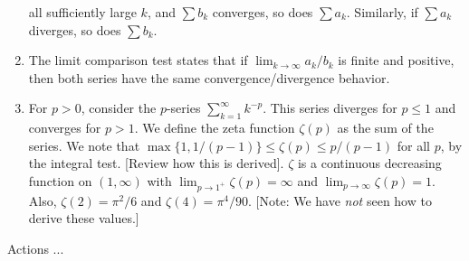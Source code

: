 \documentclass[10pt]{amsart}
\begin{document}
\begin{enumerate}
  all sufficiently large $k$, and $\sum b_k$ converges, so does $\sum
  a_k$. Similarly, if $\sum a_k$ diverges, so does $\sum b_k$.
\item The limit comparison test states that if $\lim_{k \to \infty}
  a_k/b_k$ is finite and positive, then both series have the same
  convergence/divergence behavior.
\item For $p > 0$, consider the $p$-series $\sum_{k=1}^\infty
  k^{-p}$. This series diverges for $p \le 1$ and converges for $p >
  1$. We define the zeta function $\zeta(p)$ as the sum of the
  series. We note that $\max \{ 1, 1/(p-1) \} \le \zeta(p) \le
  p/(p-1)$ for all $p$, by the integral test. [Review how this is
  derived]. $\zeta$ is a continuous decreasing function on
  $(1,\infty)$ with $\lim_{p \to 1^+} \zeta(p) = \infty$ and $\lim_{p
  \to \infty} \zeta(p) = 1$. Also, $\zeta(2) = \pi^2/6$ and $\zeta(4)
  = \pi^4/90$. [Note: We have {\em not} seen how to derive these values.]
\end{enumerate}

Actions ...
\end{document}
